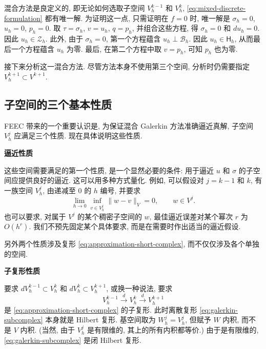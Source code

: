 混合方法是良定义的, 即无论如何选取子空间 $V_h^{k-1}$ 和 $V_h^k$, \eqref{eq:mixed-discrete-formulation} 都有唯一解. 为证明这一点, 只需证明在 $f=0$ 时, 唯一解是 $\sigma_h=0$, $u_h=0$, $p_h=0$. 取 $\tau=\sigma_h$, $v=u_h$, $q=p_h$, 并组合这些方程, 得 $\sigma_h=0$ 和 $du_h=0$. 因此 $u_h\in\mathcal Z_h$. 此外, 由于 $\sigma_h=0$, 第一个方程蕴含 $u_h\perp\mathcal B_h$. 因此 $u_h\in\mathsf H_h$, 从而最后一个方程蕴含 $u_h$ 为零. 最后, 在第二个方程中取 $v=p_h$, 可知 $p_h$ 也为零.

接下来分析这一混合方法. 尽管方法本身不使用第三个空间, 分析时仍需要指定 $V_h^{k+1}\subset V^{k+1}$.

\subsection{子空间的三个基本性质}\label{subsec:mixed-three-properties}

FEEC 带来的一个重要认识是, 为保证混合 Galerkin 方法准确逼近真解, 子空间 $V_h^j$ 应满足三个性质. 现在具体说明这些性质.

\medskip\noindent\textbf{{逼近性质}}\par
这些空间需要满足的第一个性质, 是一个显然必要的条件: 用于逼近 $u$ 和 $\sigma$ 的子空间应提供良好的逼近. 这可以用多种方式量化. 例如, 可以假设对 $j=k-1$ 和 $k$, 有一族空间 $V_h^j$, 由递减至 $0$ 的 $h$ 编号, 并要求
\begin{equation}\label{eq:galerkin-approximation-property}
\lim_{h\to0}\inf_{v\in V_h^j}\|w-v\|_V=0,\qquad w\in V^j.
\end{equation}
也可以要求, 对属于 $V^j$ 的某个稠密子空间的 $w$, 最佳逼近误差对某个幂次 $r$ 为 $O(h^r)$. 我们不预先固定某个具体要求, 而是在需要时作出适当的逼近假设.

另外两个性质涉及复形 \eqref{eq:approximation-short-complex}, 而不仅仅涉及各个单独的空间.

\medskip\noindent\textbf{{子复形性质}}\par
要求 $dV_h^{k-1}\subset V_h^k$ 和 $dV_h^k\subset V_h^{k+1}$, 或换一种说法, 要求
\begin{equation}\label{eq:galerkin-subcomplex}
V_h^{k-1}\xrightarrow{d}V_h^k\xrightarrow{d}V_h^{k+1}
\end{equation}
是 \eqref{eq:approximation-short-complex} 的子复形. 此时离散复形 \eqref{eq:galerkin-subcomplex} 本身就是 Hilbert 复形. 基空间取为 $W_h^j=V_h^j$, 但赋予 $W$ 内积, 而不是 $V$ 内积. (当然, 由于 $V_h^j$ 是有限维的, 其上的所有内积都等价.) 由于是有限维的, \eqref{eq:galerkin-subcomplex} 是闭 Hilbert 复形.

